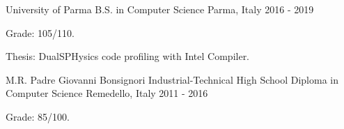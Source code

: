 \begin{cventries}
  \cventry
    {University of Parma} %
    {B.S. in Computer Science} %
    {Parma, Italy} %
    {2016 - 2019} %
    {
      \begin{cvitems} %
        \item {Grade: 105/110.}
        \item {Thesis: DualSPHysics code profiling with Intel Compiler.}
      \end{cvitems}
    }

  \cventry
    {M.R. Padre Giovanni Bonsignori} %
    {Industrial-Technical High School Diploma in Computer Science} %
    {Remedello, Italy} %
    {2011 - 2016} %
    {
      \begin{cvitems} %
        \item {Grade: 85/100.}
      \end{cvitems}
    }

\end{cventries}
